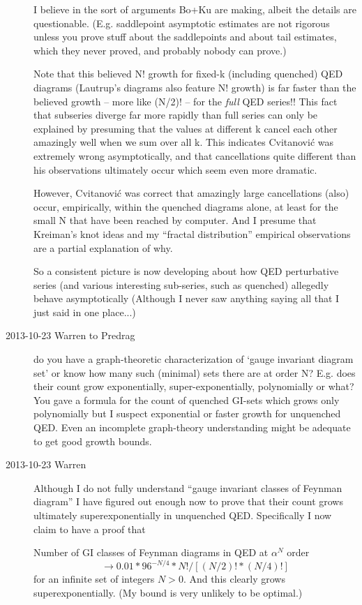 \begin{description}
I believe in the sort of arguments Bo+Ku are making, albeit the
details are questionable.
(E.g. saddlepoint asymptotic estimates are not rigorous unless you prove stuff
about the saddlepoints and about tail estimates, which they never proved, and
probably nobody can prove.)

Note that this believed N! growth for fixed-k (including quenched) QED diagrams
(Lautrup's diagrams also feature N! growth) is far faster than the
believed growth -- more like (N/2)! -- for the \emph{full} QED series!!
This fact that subseries diverge far more rapidly than full series
can only be explained by presuming that
the values at different k cancel each other amazingly well when we sum
over all k.
This indicates Cvitanovi\'c was extremely wrong asymptotically, and that
cancellations
quite different than his observations ultimately occur which seem even
more dramatic.

However, Cvitanovi\'c was correct that amazingly large cancellations
(also) occur, empirically, within the quenched diagrams alone, at least
for the small N that have been reached by computer.   And I presume that
Kreiman's knot ideas and my ``fractal distribution''
empirical observations are a partial explanation of why.

So a consistent picture is now developing about how QED perturbative series (and
various interesting sub-series, such as quenched) allegedly behave
asymptotically
(Although I never saw anything saying all that I just said in one place...)

\item[2013-10-23  Warren to Predrag]  do you have a graph-theoretic
characterization of `gauge invariant diagram set' or know how many such
(minimal) sets there are at order N?   E.g. does their count grow
exponentially, super-exponentially, polynomially or what?  You gave a
formula for the count of quenched GI-sets which grows only polynomially
but I suspect exponential or faster growth for unquenched QED.  Even an
incomplete graph-theory understanding might be adequate to get good growth
bounds.

\item[2013-10-23 Warren]
Although I do not fully understand ``gauge invariant classes of Feynman diagram''
I have figured out enough now to prove that their count grows
ultimately superexponentially in unquenched QED.  Specifically I now
claim to have a proof that

  Number of GI classes of Feynman diagrams in QED at $\alpha^N$ order
\[
  \to 0.01 *  96^{-N/4} * N! / [ (N/2)! * (N/4)! ]
\]
for an infinite set of integers $N>0$.
And this clearly grows superexponentially.
(My bound is very unlikely to be optimal.)


\end{description}

